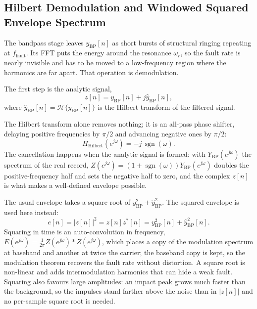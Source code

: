\subsection{Hilbert Demodulation and Windowed Squared Envelope Spectrum}
The bandpass stage leaves $y_{\text{BP}}[n]$ as short bursts of structural
ringing repeating at $f_{\text{fault}}$. Its FFT puts the energy around the
resonance $\omega_r$, so the fault rate is nearly invisible and has to be moved
to a low-frequency region where the harmonics are far apart. That operation is
demodulation.

The first step is the analytic signal,
\begin{equation}
  z[n] = y_{\text{BP}}[n] + j\hat{y}_{\text{BP}}[n],
  \label{eq:analytic}
\end{equation}
where $\hat{y}_{\text{BP}}[n]=\mathcal{H}\{y_{\text{BP}}[n]\}$ is the Hilbert
transform of the filtered signal.

The Hilbert transform alone removes nothing; it is an all-pass phase shifter,
delaying positive frequencies by $\pi/2$ and advancing negative ones by $\pi/2$:
\begin{equation}
  H_{\text{Hilbert}}(e^{j\omega}) = -j\,\operatorname{sgn}(\omega).
  \label{eq:hilbert}
\end{equation}
The cancellation happens when the analytic signal is formed: with
$Y_{\text{BP}}(e^{j\omega})$ the spectrum of the real record,
$Z(e^{j\omega}) = \left(1 + \operatorname{sgn}(\omega)\right)
Y_{\text{BP}}(e^{j\omega})$ doubles the positive-frequency half and sets the
negative half to zero, and the complex $z[n]$ is what makes a well-defined
envelope possible.

The usual envelope takes a square root of $y_{\text{BP}}^2+\hat{y}_{\text{BP}}^2$.
The squared envelope is used here instead:
\begin{equation}
  e[n] = |z[n]|^2 = z[n]z^{*}[n] = y_{\text{BP}}^2[n] + \hat{y}_{\text{BP}}^2[n].
  \label{eq:se}
\end{equation}
Squaring in time is an auto-convolution in frequency,
$E(e^{j\omega}) = \frac{1}{2\pi} Z(e^{j\omega}) * Z(e^{j\omega})$, which places
a copy of the modulation spectrum at baseband and another at twice the carrier;
the baseband copy is kept, so the modulation theorem recovers the fault rate
without distortion. A square root is non-linear and adds intermodulation
harmonics that can hide a weak fault. Squaring also favours large amplitudes:
an impact peak grows much faster than the background, so the impulses stand
farther above the noise than in $|z[n]|$ and no per-sample square root is
needed.

